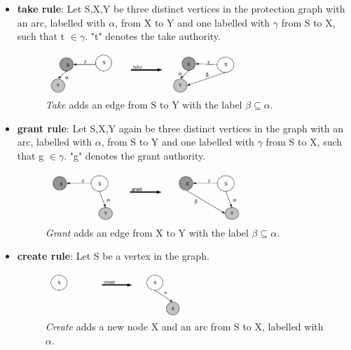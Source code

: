 \begin{itemize}
\item \textbf{take rule}: Let S,X,Y be three distinct vertices in the protection graph with an arc, labelled with $\alpha$, from X to Y and one labelled with $\gamma$ from S to X, such that t $\in \gamma.$  "t" denotes the take authority.
\begin{figure}[H]
\centering
	\includegraphics[width=0.7\textwidth]{./Pictures/takeRule.png}
	\caption[take rule]{\textit{Take} adds an edge from S to Y with the label $\beta \subseteq \alpha$. \cite{TakeG}}
	\label{fig:cltake}
\end{figure}	
	
\item \textbf{grant rule}:	Let S,X,Y again be three distinct vertices in the graph with an arc, labelled with  $\alpha$, from S to Y and one labelled with $\gamma$ from S to X, such that g $\in \gamma$. "g" denotes the grant authority.
\begin{figure}[H]
\centering
	\includegraphics[width=0.7\textwidth]{./Pictures/grantRule.png}
	\caption[grant rule]{\textit{Grant} adds an edge from X to Y with the label $\beta \subseteq \alpha$.  \cite{TakeG}}
	\label{fig:clgrant}
\end{figure}	
	
\item \textbf{create rule}: Let S be a vertex in the graph. 
\begin{figure}[H]
\centering
	\includegraphics[width=0.5\textwidth]{./Pictures/createRule.png}
	\caption[create rule]{\textit{Create} adds a new node X and an arc from S to X, labelled with $\alpha$. \cite{TakeG}}
	\label{fig:clcreate}
\end{figure}	


\end{itemize}
